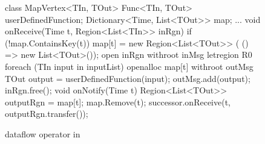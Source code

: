 \begin{figure}[t!]
\begin{numcodejava}
class MapVertex<TIn, TOut> {
  Func<TIn, TOut> userDefinedFunction;
  Dictionary<Time, List<TOut>> map;
  ...
  void onReceive(Time t, Region<List<TIn>> inRgn) {
    if (!map.ContainsKey(t))
       map[t] = new Region<List<TOut>> (
                  () => new List<TOut>());
    open inRgn withroot inMsg {
      letregion R0 {
        foreach (TIn input in inputList) {
          openalloc map[t] withroot outMsg {
            TOut output = userDefinedFunction(input);
            outMsg.add(output);
          }
        }
      }
    }
    inRgn.free();
  }
  void onNotify(Time t) {
     Region<List<TOut>> outputRgn = map[t];
     map.Remove(t);
     successor.onReceive(t, outputRgn.transfer()); 
  }
}
\end{numcodejava}
\caption{ dataflow operator in \name}
\label{fig:motivating-eg-in-broom}
\end{figure}
